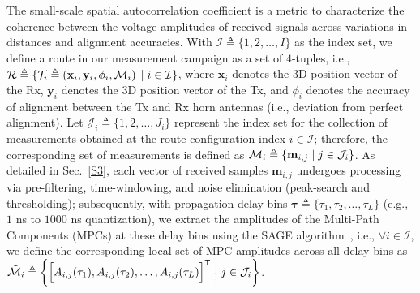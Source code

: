\documentclass[10pt, twocolumn]{IEEEtran}
\newcommand{\suchthat}{\;\ifnum\currentgrouptype=16 \middle\fi|\;}
\begin{document}
{The small-scale spatial autocorrelation coefficient is a metric to characterize the coherence between the voltage amplitudes of received signals across variations in distances and alignment accuracies. With $\mathcal{I} \triangleq \{1,2,{\dots},I\}$ as the index set, we define a route in our measurement campaign as a set of $4$-tuples, i.e., $\mathcal{R} \triangleq \{\mathcal{T}_{i} \triangleq \left(\mathbf{x}_{i}, \mathbf{y}_{i}, \phi_{i}, \mathcal{M}_{i}\right) \suchthat i \in \mathcal{I}\}$, where $\mathbf{x}_{i}$ denotes the $3$D position vector of the Rx, $\mathbf{y}_{i}$ denotes the $3$D position vector of the Tx, and $\phi_{i}$ denotes the accuracy of alignment between the Tx and Rx horn antennas (i.e., deviation from perfect alignment). Let $\mathcal{J}_{i} \triangleq \{1,2,{\dots},J_{i}\}$ represent the index set for the collection of measurements obtained at the route configuration index $i \in \mathcal{I}$; therefore, the corresponding set of measurements is defined as $\mathcal{M}_{i} \triangleq \{\mathbf{m}_{i,j} \suchthat j \in \mathcal{J}_{i}\}$. As detailed in Sec.~\ref{S3}, each vector of received samples $\mathbf{m}_{i,j}$ undergoes processing via pre-filtering, time-windowing, and noise elimination (peak-search and thresholding); subsequently, with propagation delay bins $\boldsymbol{\tau} \triangleq \{\tau_{1},\tau_{2},{\dots},\tau_{L}\}$ (e.g., $1$ ns to $1000$ ns quantization), we extract the amplitudes of the Multi-Path Components (MPCs) at these delay bins using the SAGE algorithm~\cite{SAGE}, i.e., $\forall i \in \mathcal{I}$, we define the corresponding local set of MPC amplitudes across all delay bins as $\tilde{\mathcal{M}}_{i} \triangleq \left\{\Big[A_{i,j}(\tau_{1}), A_{i,j}(\tau_{2}), \dots, A_{i,j}(\tau_{L})\Big]^{\mathsf{T}} \suchthat j \in \mathcal{J}_{i}\right\}$.

}
\end{document}
